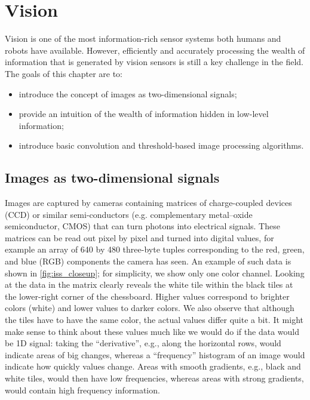 \chapter{Vision}\label{chap:vision}

Vision is one of the most information-rich sensor systems both humans and robots have available. However, efficiently and accurately processing the wealth of information that is generated by vision sensors is still a key challenge in the field. The goals of this chapter are to:
\begin{itemize}
\item introduce the concept of images as two-dimensional signals;
\item provide an intuition of the wealth of information hidden in low-level information;
\item introduce basic convolution and threshold-based image processing algorithms.
\end{itemize}

\section{Images as two-dimensional signals}

Images are captured by cameras containing matrices of charge-coupled devices (CCD) or similar semi-conductors (e.g. complementary metal–oxide semiconductor, CMOS) that can turn photons into electrical signals. These matrices can be read out pixel by pixel and turned into digital values, for example an array of 640 by 480 three-byte tuples corresponding to the red, green, and blue (RGB) components the camera has seen. An example of such data is shown in \cref{fig:iss_closeup}; for simplicity, we show only one color channel.
Looking at the data in the matrix clearly reveals the white tile within the black tiles at the lower-right corner of the chessboard. Higher values correspond to brighter colors (white) and lower values to darker colors. We also observe that although the tiles have to have the same color, the actual values differ quite a bit. It might make sense to think about these values much like we would do if the data would be 1D signal: taking the ``derivative'', e.g., along the horizontal rows, would indicate areas of big changes, whereas a ``frequency'' histogram of an image  would indicate how quickly values change. Areas with smooth gradients, e.g., black and white tiles, would then have low frequencies, whereas areas with strong gradients, would contain high frequency information.

